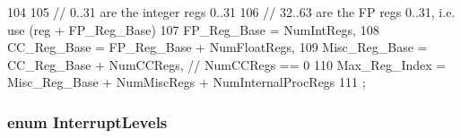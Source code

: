\begin{DoxyCode}
104                     {
105     // 0..31 are the integer regs 0..31
106     // 32..63 are the FP regs 0..31, i.e. use (reg + FP_Reg_Base)
107     FP_Reg_Base = NumIntRegs,
108     CC_Reg_Base = FP_Reg_Base + NumFloatRegs,
109     Misc_Reg_Base = CC_Reg_Base + NumCCRegs, // NumCCRegs == 0
110     Max_Reg_Index = Misc_Reg_Base + NumMiscRegs + NumInternalProcRegs
111 };
\end{DoxyCode}
\hypertarget{namespaceAlphaISA_aa201d1f9b8ac67b80bdf6c08f370558c}{
\subsubsection[{InterruptLevels}]{\setlength{\rightskip}{0pt plus 5cm}enum {\bf InterruptLevels}}}
\label{namespaceAlphaISA_aa201d1f9b8ac67b80bdf6c08f370558c}
